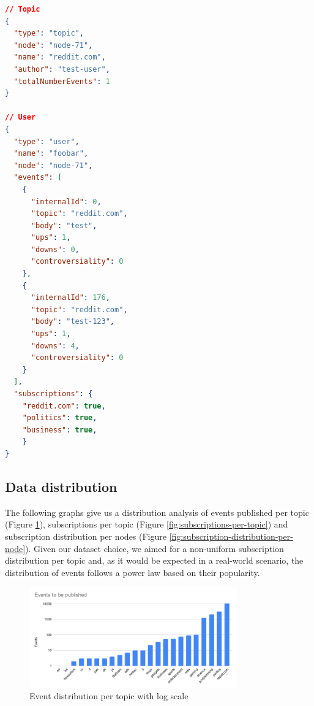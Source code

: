 \begin{lstlisting}[language=JSON, float, caption={Data example to be used in testbed},label={dataset-output}]
// Topic
{
  "type": "topic",
  "node": "node-71",
  "name": "reddit.com",
  "author": "test-user",
  "totalNumberEvents": 1
}

// User
{
  "type": "user",
  "name": "foobar",
  "node": "node-71",
  "events": [
    {
      "internalId": 0,
      "topic": "reddit.com",
      "body": "test",
      "ups": 1,
      "downs": 0,
      "controversiality": 0
    },
    {
      "internalId": 176,
      "topic": "reddit.com",
      "body": "test-123",
      "ups": 1,
      "downs": 4,
      "controversiality": 0
    }
  ],
  "subscriptions": {
  	"reddit.com": true,
  	"politics": true,
  	"business": true,
	}
}
\end{lstlisting}

\subsection{Data distribution}\label{subsec:data-distribution}

The following graphs give us a distribution analysis of events published per
topic (Figure \ref{fig:events-to-be-publisher-per-topic}), subscriptions per
topic (Figure \ref{fig:subscriptions-per-topic}) and subscription distribution
per nodes (Figure \ref{fig:subscription-distribution-per-node}). Given our
dataset choice, we aimed for a non-uniform subscription distribution per topic
and, as it would be expected in a real-world scenario, the distribution of
events follows a power law based on their popularity. 

\begin{figure}[!htb]
  \centering
  \includegraphics[width=0.8\textwidth]{../images/events-to-be-publisher-per-topic.png}
  \caption{Event distribution per topic with log scale}
  \label{fig:events-to-be-publisher-per-topic}
\end{figure}

